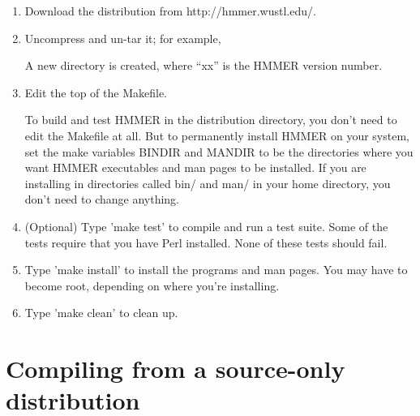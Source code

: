 \begin{enumerate}
\item Download the distribution from http://hmmer.wustl.edu/.

\item Uncompress and un-tar it; for example, \\

	A new directory  is created, where ``xx'' is
	the HMMER version number.

\item Edit the top of the Makefile. 

To build and test HMMER in the distribution directory, you don't need
to edit the Makefile at all. But to permanently install HMMER on your
system, set the make variables BINDIR and MANDIR to be the directories
where you want HMMER executables and man pages to be installed. If you
are installing in directories called bin/ and man/ in your home
directory, you don't need to change anything.

\item (Optional) Type 'make test' to compile and run a test suite.
Some of the tests require that you have Perl installed. None of these
tests should fail.

\item Type 'make install' to install the programs and man pages. 
You may have to become root, depending on where you're installing.

\item Type 'make clean' to clean up.
\end{enumerate}

\section{Compiling from a source-only distribution}

